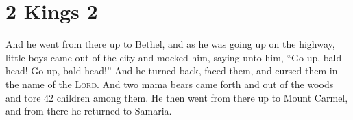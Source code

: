 \section{2 Kings 2}\label{2 Kings 2}
\begin{enumerate}[align=center]
     And he went from there up to Bethel, and as he was going up on the highway, little boys came out of the city and mocked him, saying unto him, ``Go up, bald head! Go up, bald head!''%
     And he turned back, faced them, and cursed them in the name of the \textsc{Lord}. And two mama bears came forth and out of the woods and tore 42 children among them.%
     He then went from there up to Mount Carmel, and from there he returned to Samaria.%
\end{enumerate}
